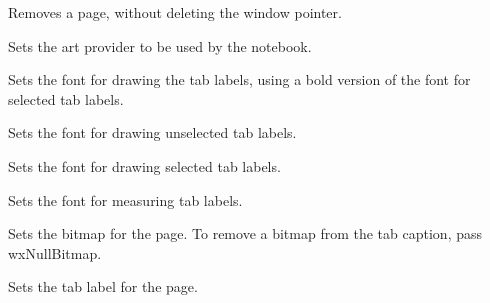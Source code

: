 \label{wxauinotebookremovepage}


Removes a page, without deleting the window pointer.

\label{wxauinotebooksetartprovider}


Sets the art provider to be used by the notebook.

\label{wxauinotebooksetfont}


Sets the font for drawing the tab labels, using a bold version of the font for selected tab labels.

\label{wxauinotebooksetnormalfont}


Sets the font for drawing unselected tab labels.

\label{wxauinotebooksetselectedfont}


Sets the font for drawing selected tab labels.

\label{wxauinotebooksetmeasuringfont}


Sets the font for measuring tab labels.

\label{wxauinotebooksetpagebitmap}


Sets the bitmap for the page.  To remove a bitmap from the tab caption, pass
wxNullBitmap.

\label{wxauinotebooksetpagetext}


Sets the tab label for the page.

\label{wxauinotebooksetselection}

